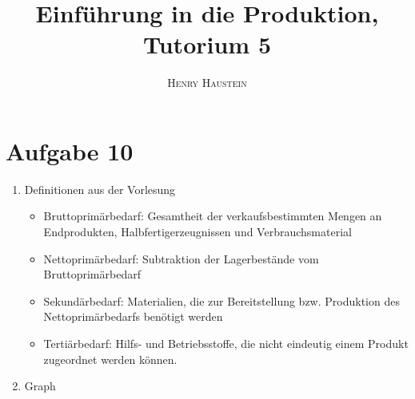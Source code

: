 \documentclass{article}
\title{\textbf{Einführung in die Produktion, Tutorium 5}}
\author{\textsc{Henry Haustein}}
\date{}
\begin{document}
	\maketitle
	
	\section*{Aufgabe 10}
	\begin{enumerate}[label=(\alph*)]
		\item Definitionen aus der Vorlesung
		\begin{itemize}
			\item Bruttoprimärbedarf: Gesamtheit der verkaufsbestimmten Mengen an Endprodukten, Halbfertigerzeugnissen und Verbrauchsmaterial
			\item Nettoprimärbedarf: Subtraktion der Lagerbestände vom Bruttoprimärbedarf
			\item Sekundärbedarf: Materialien, die zur Bereitstellung bzw. Produktion des Nettoprimärbedarfs benötigt werden
			\item Tertiärbedarf: Hilfs- und Betriebsstoffe, die nicht eindeutig einem Produkt zugeordnet werden können.
		\end{itemize}
		\item Graph
		\begin{center}
\end{center}
\end{enumerate}
\end{document}
